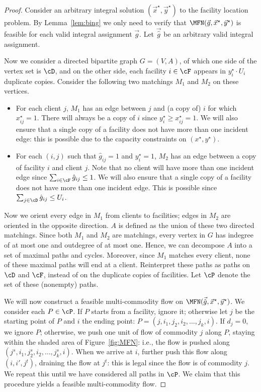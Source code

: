 \begin{proof}
  Consider an arbitrary integral solution $(\vec{x}^{\star}, \vec{y}^{\star})$ to the facility location
  problem. By Lemma~\ref{lem:bing} we only need to verify that $\MFN(\vec{ g}, \vec{x}^{\star},
  \vec{y}^{\star})$ is feasible for each valid integral assignment $\vec{ g}$. Let
  $\vec{\hat g}$ be an arbitrary valid integral assignment.

Now we consider a directed bipartite graph $G=(V,A)$, of which one side of the vertex set is $\cD$, and on the other side, each facility $i\in\cF$ appears in $y^{\star}_i\cdot U_i$ duplicate copies. Consider the following two matchings $M_1$ and $M_2$ on these vertices.\begin{itemize}
\item For each client $j$, $M_1$ has an edge between $j$ and (a copy of) $i$ for which $x^{\star}_{ij}=1$. There will always be a copy of $i$ since $y_i^{\star}\geq x_{ij}^{\star}=1$. We will also ensure that a single copy of a facility does not have more than one incident edge: this is possible due to the capacity constraints on $(x^{\star},y^{\star})$.
\item For each $(i,j)$ such that $\hat g_{ij}=1$ and $y^{\star}_i=1$, $M_2$ has an edge between a copy of facility $i$ and client $j$. Note that no client will have more than one incident edge since $\sum_{i\in\cF}\hat g_{ij}\leq 1$. We will also ensure that a single copy of a facility does not have more than one incident edge. This is possible since $\sum_{j\in\cD}\hat g_{ij}\leq U_i$.
\end{itemize}Now we orient every edge in $M_1$ from clients to facilities; edges in $M_2$ are oriented in the opposite direction. $A$ is defined as the union of these two directed matchings. Since both $M_1$ and $M_2$ are matchings, every vertex in $G$ has indegree of at most one and outdegree of at most one. Hence, we can decompose $A$ into a set of maximal paths and cycles. Moreover, since $M_1$ matches every client, none of these maximal paths will end at a client. Reinterpret these paths as paths on $\cD$ and $\cF$, instead of on the duplicate copies of facilities. Let $\cP$ denote the set of these (nonempty) paths.

We will now construct a feasible multi-commodity flow on $\MFN(\vec{\hat g},\vec x^{\star},\vec y^{\star})$. We consider each $P\in\cP$. If $P$ starts from a facility, ignore it; otherwise let $j$ be the starting point of $P$ and $i$ the ending point: $P=( j,i_1,j_2,i_2, \ldots,j_k, i)$. If $d_j=0$, we ignore $P$; otherwise, we push one unit of flow of commodity $j$ along $P$, staying within the shaded area of Figure~\ref{fig:MFN}: i.e., the flow is pushed along $( j^s,i_1,j_2^s,i_2, \ldots,j_k^s, i)$. When we arrive at $i$, further push this flow along $( i,i',j^t) $, draining the flow at $j^t$: this is legal since the flow is of commodity $j$. We repeat this until we have considered all paths in $\cP$. We claim that this procedure yields a feasible multi-commodity flow.


\end{proof}
